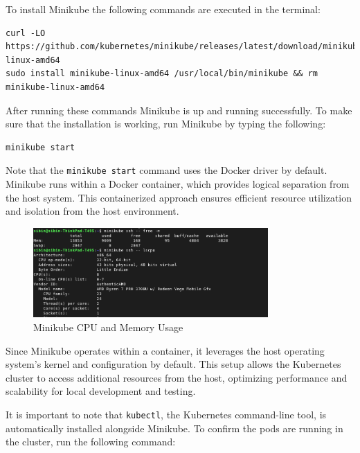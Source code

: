 To install Minikube the following commands are executed in the terminal:

\begin{lstlisting}[breaklines=true,basicstyle=\small\ttfamily,frame=single]
curl -LO https://github.com/kubernetes/minikube/releases/latest/download/minikube-linux-amd64
sudo install minikube-linux-amd64 /usr/local/bin/minikube && rm minikube-linux-amd64
\end{lstlisting}

After running these commands Minikube is up and running successfully. To make sure that the installation is working, run Minikube by typing the following:

\begin{lstlisting}[breaklines=true,basicstyle=\small\ttfamily,frame=single]
minikube start
\end{lstlisting}

Note that the \texttt{minikube start} command uses the Docker driver by default. Minikube runs within a Docker container, which provides logical separation from the host system. This containerized approach ensures efficient resource utilization and isolation from the host environment.

\begin{figure}[h!]
    \centering
    \includegraphics[width=0.8\textwidth]{implementation/minikube-cpunmem.png}
    \caption{Minikube CPU and Memory Usage}
    \label{fig:minikube-cpu-and-memory}
\end{figure}

Since Minikube operates within a container, it leverages the host operating system's kernel and configuration by default. This setup allows the Kubernetes cluster to access additional resources from the host, optimizing performance and scalability for local development and testing.

It is important to note that \texttt{kubectl}, the Kubernetes command-line tool, is automatically installed alongside Minikube. To confirm the pods are running in the cluster, run the following command:

